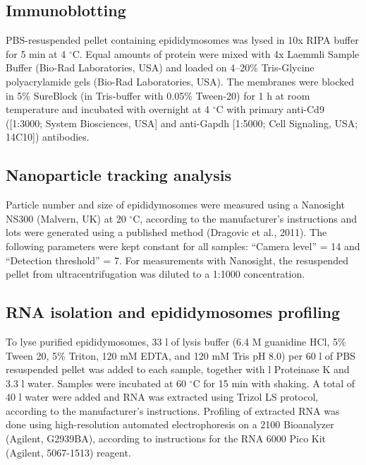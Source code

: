 \documentclass[12pt,twoside]{reedthesis}
\begin{document}
\hypertarget{immunoblotting}{%
\subsection{Immunoblotting}\label{immunoblotting}}

PBS-resuspended pellet containing epididymosomes was lysed in 10x RIPA buffer for 5 min at 4 \(^{\circ}\)C. Equal amounts of protein were mixed with 4x Laemmli Sample Buffer (Bio-Rad Laboratories, USA) and loaded on 4--20\% Tris-Glycine polyacrylamide gels (Bio-Rad Laboratories, USA). The membranes were blocked in 5\% SureBlock (in Tris-buffer with 0.05\% Tween-20) for 1 h at room temperature and incubated with overnight at 4 \(^{\circ}\)C with primary anti-Cd9 ({[}1:3000; System Biosciences, USA{]} and anti-Gapdh {[}1:5000; Cell Signaling, USA; 14C10{]}) antibodies.

\hypertarget{nanoparticle-tracking-analysis}{%
\subsection{Nanoparticle tracking analysis}\label{nanoparticle-tracking-analysis}}

Particle number and size of epididymosomes were measured using a Nanosight NS300 (Malvern, UK) at 20 \(^{\circ}\)C, according to the manufacturer's instructions and lots were generated using a published method (Dragovic et al., 2011). The following parameters were kept constant for all samples: ``Camera level'' = 14 and ``Detection threshold'' = 7. For measurements with Nanosight, the resuspended pellet from ultracentrifugation was diluted to a 1:1000 concentration.

\hypertarget{rna-isolation-and-epididymosomes-profiling}{%
\subsection{RNA isolation and epididymosomes profiling}\label{rna-isolation-and-epididymosomes-profiling}}

To lyse purified epididymosomes, 33 \textmu l of lysis buffer (6.4 M guanidine HCl, 5\% Tween 20, 5\% Triton, 120 mM EDTA, and 120 mM Tris pH 8.0) per 60 \textmu l of PBS resuspended pellet was added to each sample, together with \textmu l Proteinase K and 3.3 \textmu l water. Samples were incubated at 60 \(^{\circ}\)C for 15 min with shaking. A total of 40 \textmu l water were added and RNA was extracted using Trizol LS protocol, according to the manufacturer's instructions. Profiling of extracted RNA was done using high-resolution automated electrophoresis on a 2100 Bioanalyzer (Agilent, G2939BA), according to instructions for the RNA 6000 Pico Kit (Agilent, 5067-1513) reagent.
\end{document}
